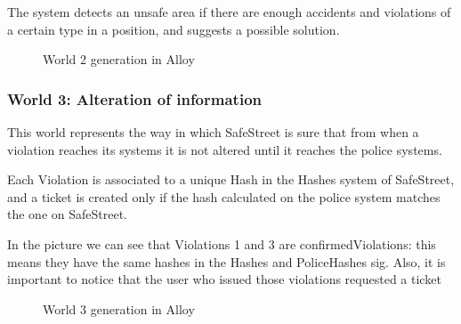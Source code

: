 The system detects an unsafe area if there are enough accidents and violations of a certain type in a position, and
suggests a possible solution.

\begin{figure}
    \noindent{}
    \caption{World 2 generation in Alloy}
\end{figure}

\subsubsection{World 3: Alteration of information}
This world represents the way in which SafeStreet is sure that from when a violation reaches its systems it
is not altered until it reaches the police systems.

Each Violation is associated to a unique Hash in the Hashes system of SafeStreet, and a ticket is created
only if the hash calculated on the police system matches the one on SafeStreet.

In the picture we can see
that Violations 1 and 3 are confirmedViolations: this means they have the same hashes in the Hashes and PoliceHashes sig.
Also, it is important to notice that the user who issued those violations requested a ticket

\begin{figure}
    \noindent{}
    \caption{World 3 generation in Alloy}
\end{figure}